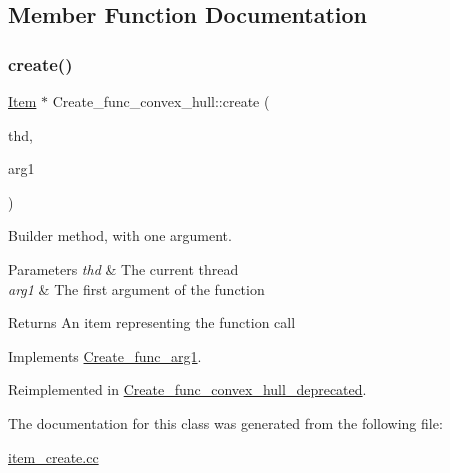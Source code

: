 \subsection{Member Function Documentation}
\mbox{\label{classCreate__func__convex__hull_ad215a1f74dc69316aa8e64e577964935}} 
\subsubsection{\texorpdfstring{create()}{create()}}
{\footnotesize\ttfamily \mbox{\hyperlink{classItem}{Item}} $\ast$ Create\+\_\+func\+\_\+convex\+\_\+hull\+::create (\begin{DoxyParamCaption}\item[{T\+HD $\ast$}]{thd,  }\item[{\mbox{\hyperlink{classItem}{Item}} $\ast$}]{arg1 }\end{DoxyParamCaption})\hspace{0.3cm}{\ttfamily [virtual]}}

Builder method, with one argument. 
\begin{DoxyParams}{Parameters}
{\em thd} & The current thread \\
\hline
{\em arg1} & The first argument of the function \\
\hline
\end{DoxyParams}
\begin{DoxyReturn}{Returns}
An item representing the function call 
\end{DoxyReturn}


Implements \mbox{\hyperlink{classCreate__func__arg1_a3e9a98f755cd82c3e762e334c955a8c9}{Create\+\_\+func\+\_\+arg1}}.



Reimplemented in \mbox{\hyperlink{classCreate__func__convex__hull__deprecated_adf24039896c580d52297e101450255f5}{Create\+\_\+func\+\_\+convex\+\_\+hull\+\_\+deprecated}}.



The documentation for this class was generated from the following file\+:\begin{DoxyCompactItemize}
\item 
\mbox{\hyperlink{item__create_8cc}{item\+\_\+create.\+cc}}\end{DoxyCompactItemize}

